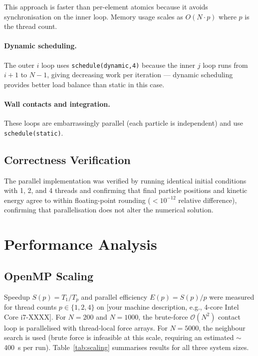 \documentclass[conference]{IEEEtran}
\begin{document}
	This approach is faster than per-element atomics because it avoids synchronisation
	on the inner loop. Memory usage scales as $O(N \cdot p)$ where $p$ is the thread count.
	
	\paragraph{Dynamic scheduling.}
	The outer $i$ loop uses \texttt{schedule(dynamic,4)} because the inner $j$
	loop runs from $i+1$ to $N-1$, giving decreasing work per iteration — dynamic
	scheduling provides better load balance than static in this case.
	
	\paragraph{Wall contacts and integration.}
	These loops are embarrassingly parallel (each particle is independent) and use
	\texttt{schedule(static)}.
	
	\subsection{Correctness Verification}
	
	The parallel implementation was verified by running identical initial
	conditions with 1, 2, and 4 threads and confirming that final particle
	positions and kinetic energy agree to within floating-point rounding
	($< 10^{-12}$ relative difference), confirming that parallelisation does not
	alter the numerical solution.
	
	\section{Performance Analysis}
	\label{sec:performance}
	
	\subsection{OpenMP Scaling}
	
	Speedup $S(p) = T_1 / T_p$ and parallel efficiency $E(p) = S(p)/p$ were
	measured for thread counts $p \in \{1, 2, 4\}$ on [your machine description,
	e.g., 4-core Intel Core i7-XXXX]. For $N=200$ and $N=1000$, the brute-force
	$\mathcal{O}(N^2)$ contact loop is parallelised with thread-local force arrays.
	For $N=5000$, the neighbour search is used (brute force is infeasible at this
	scale, requiring an estimated $\sim$400~s per run). Table~\ref{tab:scaling}
	summarises results for all three system sizes.
	
\end{document}
